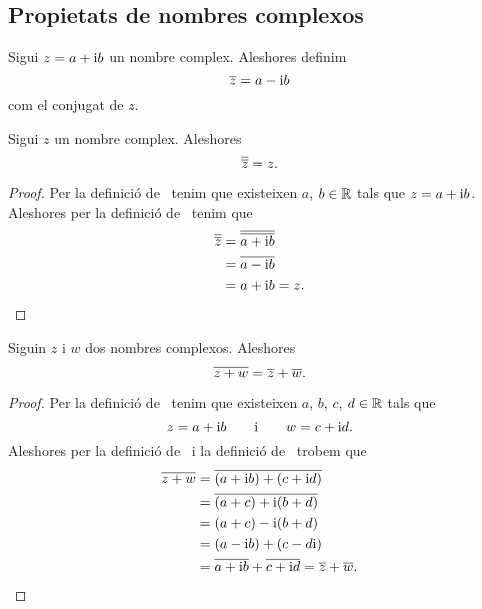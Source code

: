 \documentclass[../Apunts.tex]{subfiles}
\begin{document}
	\subsection{Propietats de nombres complexos}
	\begin{definition}
		\label{def:conjugat d'un nombre complex}
		Sigui \(z=a+\mathrm{i} b\) un nombre complex. Aleshores definim
		\[\overline{z}=a-\mathrm{i} b\]
		com el conjugat de \(z\).
	\end{definition}
	\begin{proposition}
		\label{prop:el conjugat del conjugat d'un nombre complex és ell mateix}
		Sigui \(z\) un nombre complex. Aleshores
		\[\overline{\overline{z}}=z.\]
	\end{proposition}
	\begin{proof}
		Per la definició de~ tenim que existeixen \(a\), \(b\in\mathbb{R}\) tals que \(z=a+\mathrm{i} b\). Aleshores per la definició de~ tenim que
		\begin{align*}
			\overline{\overline{z}}&=\overline{\overline{a+\mathrm{i} b}} \\
			&=\overline{a-\mathrm{i} b} \\
			&=a+\mathrm{i} b=z.\qedhere
		\end{align*}
	\end{proof}
	\begin{proposition}
		\label{prop:el conjugat de la suma és la suma de conjugats}
		Siguin \(z\) i \(w\) dos nombres complexos. Aleshores
		\[\overline{z+w}=\overline{z}+\overline{w}.\]
	\end{proposition}
	\begin{proof}
		Per la definició de~ tenim que existeixen \(a\), \(b\), \(c\), \(d\in\mathbb{R}\) tals que
		\[z=a+\mathrm{i} b\qquad\text{i}\qquad w=c+\mathrm{i} d.\]
		Aleshores per la definició de~ i la definició de~ trobem que
		\begin{align*}
			\overline{z+w}&=\overline{(a+\mathrm{i} b)+(c+\mathrm{i} d)} \\
			&=\overline{(a+c)+\mathrm{i}(b+d)} \\
			&=(a+c)-\mathrm{i}(b+d) \\
			&=(a-\mathrm{i} b)+(c-d\mathrm{i}) \\
			&=\overline{a+\mathrm{i} b}+\overline{c+\mathrm{i} d}=\overline{z}+\overline{w}.\qedhere
		\end{align*}
	\end{proof}
\end{document}
